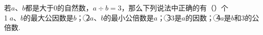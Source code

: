
若$a$、$b$都是大于$0$的自然数，$a \div b=3$，那么下列说法中正确的有（\hspace{4em}）个\\
\textcircled{1}$a$、$b$的最大公因数是$b$；
\textcircled{2}$a$、$b$的最小公倍数是$a$；	
\textcircled{3}$3$是$a$的因数；
\textcircled{4}$a$是$b$和$3$的公倍数.
